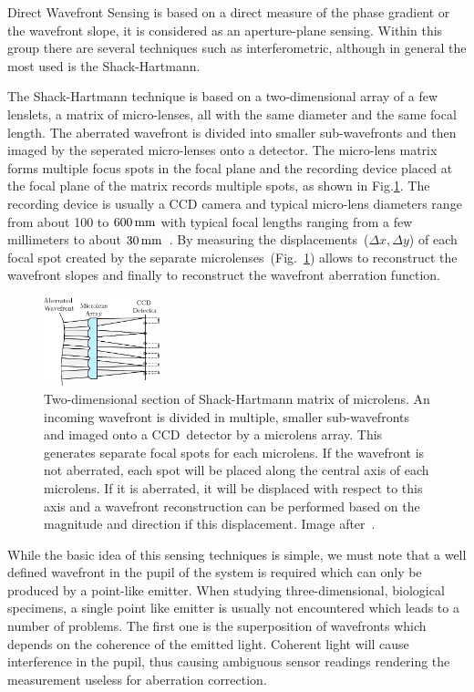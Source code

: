 Direct Wavefront Sensing is based on a direct measure of the phase gradient or the wavefront slope, it is considered as an aperture-plane sensing. Within this group there are several techniques such as interferometric, although in general the most used is the Shack-Hartmann. 

The Shack-Hartmann technique is based on a two-dimensional array of a few lenslets, a matrix of micro-lenses, all with the same diameter and the same focal length. The aberrated wavefront is divided into smaller sub-wavefronts and then imaged by the seperated micro-lenses onto a detector. The micro-lens matrix forms multiple focus spots in the focal plane and the recording device placed at the focal plane of the matrix records multiple spots, as shown in Fig.\ref{fig:SH}. The recording device is usually a CCD camera and typical micro-lens diameters range from about 100 to $\unit[600]{mm}$ with typical focal lengths ranging from a few millimeters to about $\unit[30]{mm}$~\cite{AO_vision_science}. By measuring the displacements~($\Delta x, \Delta y$) of each focal spot created by the separate microlenses~(Fig.~\ref{fig:SH}) allows to reconstruct the wavefront slopes and finally to reconstruct the wavefront aberration function.

\begin{figure}[htbp]
	\centering
		\includegraphics[width=0.30\textwidth]{images/SH}
	\caption{Two-dimensional section of Shack-Hartmann matrix of microlens. An incoming wavefront is divided in multiple, smaller sub-wavefronts and imaged onto a CCD~detector by a microlens array. This generates separate focal spots for each microlens. If the wavefront is not aberrated, each spot will be placed along the central axis of each microlens. If it is aberrated, it will be displaced with respect to this axis and a wavefront reconstruction can be performed based on the magnitude and direction if this displacement. Image after~\cite{optical_shop_testing}.}
	\label{fig:SH}
\end{figure}

While the basic idea of this sensing techniques is simple, we must note that a well defined wavefront in the pupil of the system is required which can only be produced by a point-like emitter. When studying three-dimensional, biological specimens, a single point like emitter is usually not encountered which leads to a number of problems. The first one is the superposition of wavefronts which depends on the coherence of the emitted light. Coherent light will cause interference in the pupil, thus causing ambiguous sensor readings rendering the measurement useless for aberration correction. 

